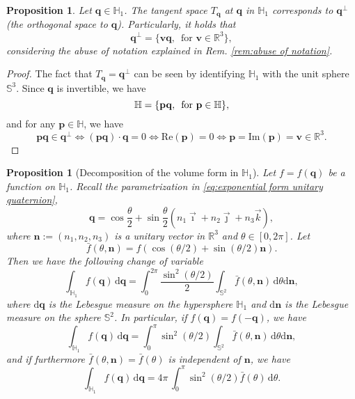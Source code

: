 \documentclass[12pt]{article}
\def\R{\mathbb{R}}
\newtheorem{proposition}[theorem]{Proposition}
\newcommand{\lp}{\left(}
\newcommand{\rp}{\right)}
\newcommand{\be}{\begin{equation}}
\newcommand{\ee}{\end{equation}}
\newcommand{\nvec}{\mathbf{n}}
\newcommand{\vv}{\mathbf{v}}
\newcommand{\ud}{\mathrm{d}}
\newcommand{\unitq}{{\mathbb{H}_1}}
\newcommand{\Ima}{\mbox{Im}}
\newcommand{\Real}{\mbox{Re}}
\newcommand{\q}{\mathbf{q}}
\newcommand{\p}{\mathbf{p}}
\begin{document}
\begin{proposition} 
\label{prop:tangent space}
Let $\q\in\unitq$. The tangent space $T_\q$ at $\q$ in $\unitq$ corresponds to $\q^\perp$ (the orthogonal space to $\q$). Particularly, it holds that
\be \label{eq:tangent space} 
\q^\perp = \{ \vv\q,\, \mbox{ for } \vv\in \R^3\},
\ee
considering the abuse of notation explained in Rem. \ref{rem:abuse of notation}.
\end{proposition}
\begin{proof}
The fact that $T_\q=\q^\perp$ can be seen by identifying $\unitq$ with the unit sphere $\mathbb{S}^3$.
Since $\q$ is invertible, we have
$$ \mathbb{H} = \{ \p\q,\, \textnormal{ for } \p \in \mathbb{H}\},$$
and for any $\p \in \mathbb{H}$, we have
$$ \p\q \in \q^\perp \iff (\p\q) \cdot \q =0 \iff \Real (\p)=0 \iff \p=\Ima(\p)=\vv\in\R^3.$$

 \end{proof}


\begin{proposition}[Decomposition of the volume form in $\unitq$] \label{prop:volume_element}
Let $f=f(\q)$ be a function on $\unitq$. Recall the parametrization in \eqref{eq:exponential form unitary quaternion},
$$ \q =\cos \frac{\theta}{2} + \sin\frac{\theta}{2}\lp n_1 \vec{\imath}+n_2\vec{\jmath}+n_3\vec{k} \rp,$$
where $\nvec:=(n_1,n_2,n_3)$ is a unitary vector in $\R^3$ and $\theta\in[0,2\pi]$. Let
$$\bar f(\theta,\nvec)= f(\cos(\theta/2)+\sin(\theta/2)\nvec).$$
Then we have the following change of variable
$$\int_{\unitq} f(\q)\, \ud\q = \int^{2\pi}_0 \frac{\sin^2(\theta/2)}{2}\int_{\mathbb{S}^2}\bar f(\theta,\nvec)\, \ud\theta \ud\nvec,$$
where $\ud\q$ is the Lebesgue measure on the hypersphere $\unitq$ and $\ud\nvec$ is the Lebesgue measure on the sphere $\mathbb{S}^2$.
In particular, if $f(\q)=f(-\q)$, we have
$$\int_{\unitq} f(\q)\, \ud\q = \int^{\pi}_0 \sin^2(\theta/2) \int_{\mathbb{S}^2}\bar f(\theta,\nvec)\, \ud\theta \ud\nvec,$$
and if furthermore $\bar f(\theta,\nvec)=\bar f(\theta)$ is independent of $\nvec$, we have
$$\int_{\unitq} f(\q)\, \ud\q = 4\pi \,\int^{\pi}_0 \sin^2(\theta/2) \bar f(\theta)\, \ud\theta.$$
\end{proposition}
\end{document}
